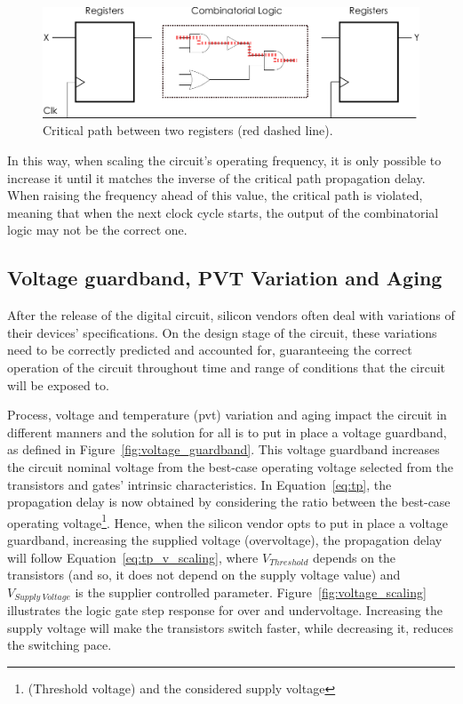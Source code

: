 \begin{figure}[htb]
    \centering
    \includegraphics[width=130mm]{Figures/Background/comb_logic.pdf}
    \caption{Critical path between two registers (red dashed line).}
    \label{fig:critical_path}
\end{figure}

In this way, when scaling the circuit's operating frequency, it is only possible to increase it until it matches the inverse of the critical path propagation delay. When raising the frequency ahead of this value, the critical path is violated, meaning that when the next clock cycle starts, the output of the combinatorial logic may not be the correct one.




\subsection{Voltage guardband, PVT Variation and Aging}

After the release of the digital circuit, silicon vendors often deal with variations of their devices' specifications. On the design stage of the circuit, these variations need to be correctly predicted and accounted for, guaranteeing the correct operation of the circuit throughout time and range of conditions that the circuit will be exposed to.

Process, voltage and temperature (\acrshort{pvt}) variation and aging impact the circuit in different manners and the solution for all is to put in place a voltage guardband, as defined in Figure~\ref{fig:voltage_guardband}. This voltage guardband increases the circuit nominal voltage from the best-case operating voltage selected from the transistors and gates' intrinsic characteristics.
In Equation~\ref{eq:tp}, the propagation delay is now obtained by considering the ratio between the best-case operating voltage\footnote{(Threshold voltage) and the considered supply voltage}. Hence, when the silicon vendor opts to put in place a voltage guardband, increasing the supplied voltage (overvoltage), the propagation delay will follow Equation~\ref{eq:tp_v_scaling}, where $V_{Threshold}$ depends on the transistors (and so, it does not depend on the supply voltage value) and $V_{Supply \: Voltage}$ is the supplier controlled parameter. Figure~\ref{fig:voltage_scaling} illustrates the logic gate step response for over and undervoltage. Increasing the supply voltage will make the transistors switch faster, while decreasing it, reduces the switching pace.



